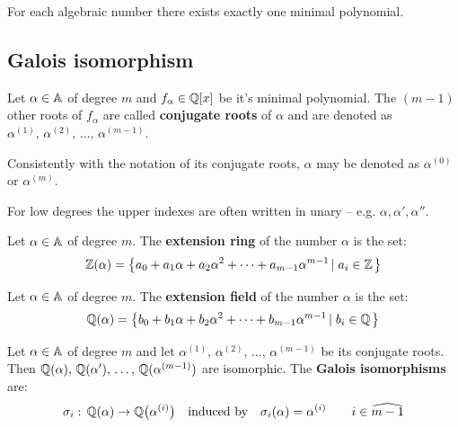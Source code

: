 \documentclass[text.tex]{subfiles}
\begin{document}
\begin{remark}
For each algebraic number there exists exactly one minimal polynomial. 
\end{remark}

\subsection{Galois isomorphism}

\begin{definition}
Let $\alpha\in\mathbb{A}$ of degree $m$ and $f_\alpha\in\mathbb{Q}[x]$ be it's minimal polynomial. The $(m-1)$ other roots of $f_\alpha$ are called \textbf{conjugate roots} of $\alpha$ and are denoted as $\alpha^{(1)},\,\alpha^{(2)},\,\dots,\,\alpha^{(m-1)}$. 
\end{definition}

\begin{remark}
Consistently with the notation of its conjugate roots, $\alpha$ may be denoted as $\alpha^{(0)}$ or $\alpha^{(m)}$.
\end{remark}

\begin{remark}
For low degrees the upper indexes are often written in unary -- e.g. $\alpha, \alpha', \alpha''$. 
\end{remark}

\begin{definition}
Let $\alpha\in\mathbb{A}$ of degree $m$. The \textbf{extension ring} of the number $\alpha$ is the set: 
$$\mathbb{Z}(\alpha) = \left\{ a_0 + a_1\alpha + a_2\alpha^2 + \dots + a_{m-1}\alpha^{m-1} \left |\; a_i\in\mathbb{Z}\right. \right\}$$
\end{definition}

\begin{definition}
Let $\alpha\in\mathbb{A}$ of degree $m$. The \textbf{extension field} of the number $\alpha$ is the set: 
$$\mathbb{Q}(\alpha) = \left\{ b_0 + b_1\alpha + b_2\alpha^2 + \dots + b_{m-1}\alpha^{m-1} \left |\; b_i\in\mathbb{Q}\right. \right\}$$
\end{definition}

\begin{definition}
Let $\alpha\in\mathbb{A}$ of degree $m$ and let $\alpha^{(1)},\,\alpha^{(2)},\,\dots,\,\alpha^{(m-1)}$ be its conjugate roots. Then $\mathbb{Q}(\alpha),\, \mathbb{Q}(\alpha'),\,\dots,\, \mathbb{Q}(\alpha^{(m-1)})$ are isomorphic. The \textbf{Galois isomorphisms} are:
$$\sigma_i:\,\mathbb{Q}(\alpha)\to\mathbb{Q}\big(\alpha^{(i)}\big)\quad\text{induced by}\quad\sigma_i(\alpha) = \alpha^{(i)}\qquad i\in\widehat{m-1}$$
\end{definition}
\end{document}
